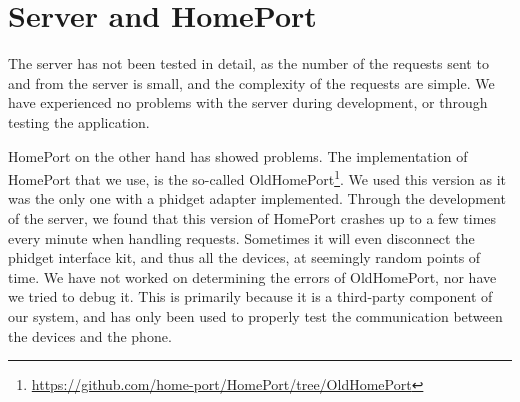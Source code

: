\section{Server and HomePort}\label{sec:servereval}

The server has not been tested in detail, 
as the number of the requests sent to and from the server is small,
and the complexity of the requests are simple. 
We have experienced no problems with the server during development,
or through testing the application. 

HomePort on the other hand has showed problems. 
The implementation of HomePort that we use, 
is the so-called OldHomePort\footnote{\url{https://github.com/home-port/HomePort/tree/OldHomePort}}. 
We used this version as it was the only one with a phidget adapter implemented. 
Through the development of the server, 
we found that this version of HomePort crashes up to a few times every minute when handling requests. 
Sometimes it will even disconnect the phidget interface kit, 
and thus all the devices, at seemingly random points of time. 
We have not worked on determining the errors of OldHomePort, 
nor have we tried to debug it. 
This is primarily because it is a third-party component of our system, 
and has only been used to properly test the communication between the devices and the phone. 